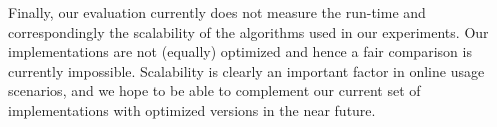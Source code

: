 Finally, our evaluation currently does not measure the run-time and correspondingly the scalability of the algorithms used in our experiments. Our implementations are not (equally) optimized and hence a fair comparison is currently impossible. Scalability is clearly an important factor in online usage scenarios, and we hope to be able to complement our current set of implementations with optimized versions in the near future.

\newpage
